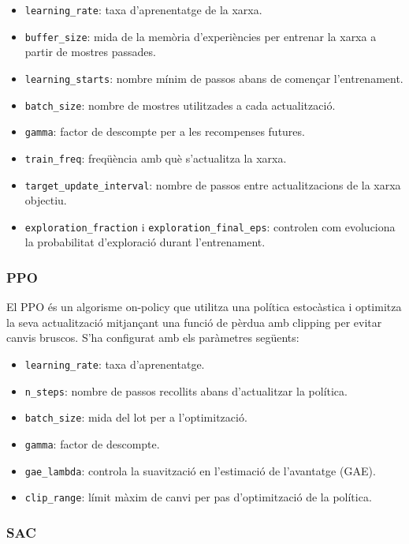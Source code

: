 \documentclass[12pt,a4paper,twoside]{book}
\begin{document}
\begin{itemize}
    \item \texttt{learning\_rate}: taxa d'aprenentatge de la xarxa.
    \item \texttt{buffer\_size}: mida de la memòria d'experiències per entrenar la xarxa a partir de mostres passades.
    \item \texttt{learning\_starts}: nombre mínim de passos abans de començar l'entrenament.
    \item \texttt{batch\_size}: nombre de mostres utilitzades a cada actualització.
    \item \texttt{gamma}: factor de descompte per a les recompenses futures.
    \item \texttt{train\_freq}: freqüència amb què s'actualitza la xarxa.
    \item \texttt{target\_update\_interval}: nombre de passos entre actualitzacions de la xarxa objectiu.
    \item \texttt{exploration\_fraction} i \texttt{exploration\_final\_eps}: controlen com evoluciona la probabilitat d'exploració durant l'entrenament.
\end{itemize}

\subsubsection{PPO}

El PPO és un algorisme on-policy que utilitza una política estocàstica i optimitza la seva actualització mitjançant una funció de pèrdua amb clipping per evitar canvis bruscos. S'ha configurat amb els paràmetres següents:

\begin{itemize}
    \item \texttt{learning\_rate}: taxa d'aprenentatge.
    \item \texttt{n\_steps}: nombre de passos recollits abans d'actualitzar la política.
    \item \texttt{batch\_size}: mida del lot per a l'optimització.
    \item \texttt{gamma}: factor de descompte.
    \item \texttt{gae\_lambda}: controla la suavització en l'estimació de l'avantatge (GAE).
    \item \texttt{clip\_range}: límit màxim de canvi per pas d'optimització de la política.
\end{itemize}


\subsubsection{SAC}
\end{document}
